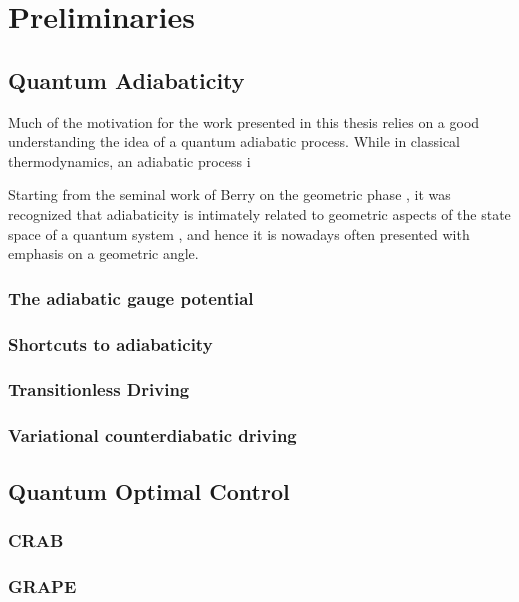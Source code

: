\chapter{Preliminaries}
    \section{Quantum Adiabaticity}
        Much of the motivation for the work presented in this thesis relies on a good understanding the idea of a quantum adiabatic process. While in classical thermodynamics, an adiabatic process i

        Starting
        from the seminal work of Berry on the geometric phase \cite{berry_transitionless_2009}, it was recognized
        that adiabaticity is intimately related to geometric aspects of the state space of a quantum system \cite{kolodrubetz_geometry_2017}, and hence it is nowadays often presented with emphasis
        on a geometric angle. 

        \subsection{The adiabatic gauge potential}
        \subsection{Shortcuts to adiabaticity}
        \subsection{Transitionless Driving}
        \subsection{Variational counterdiabatic driving}
    \section{Quantum Optimal Control}
        \subsection{CRAB}
        \subsection{GRAPE}